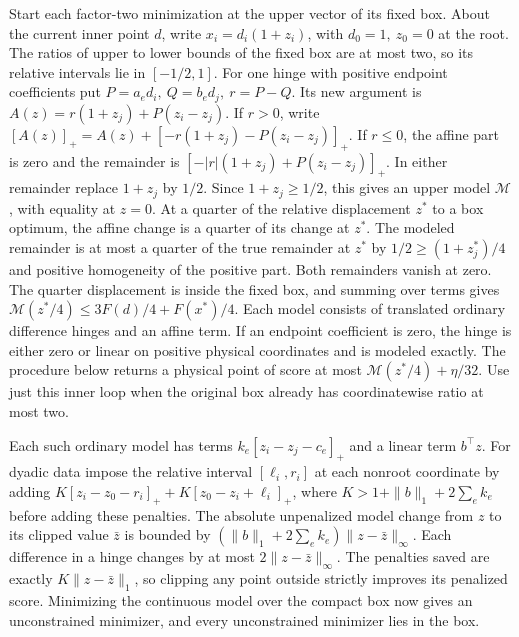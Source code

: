 \documentclass[11pt]{article}
\begin{document}
Start each factor-two minimization at the upper vector of its fixed box. About the current inner point \(d\), write \(x_i=d_i(1+z_i)\), with \(d_0=1,\ z_0=0\) at the root. The ratios of upper to lower bounds of the fixed box are at most two, so its relative intervals lie in \([-1/2,1]\). For one hinge with positive endpoint coefficients put \(P=a_e d_i,\ Q=b_e d_j,\ r=P-Q\). Its new argument is \(A(z)=r(1+z_j)+P(z_i-z_j)\). If \(r>0\), write \([A(z)]_+=A(z)+[-r(1+z_j)-P(z_i-z_j)]_+\). If \(r\le0\), the affine part is zero and the remainder is \([-|r|(1+z_j)+P(z_i-z_j)]_+\). In either remainder replace \(1+z_j\) by \(1/2\). Since \(1+z_j\ge1/2\), this gives an upper model \(\mathcal M\), with equality at \(z=0\). At a quarter of the relative displacement \(z^*\) to a box optimum, the affine change is a quarter of its change at \(z^*\). The modeled remainder is at most a quarter of the true remainder at \(z^*\) by \(1/2\ge(1+z_j^*)/4\) and positive homogeneity of the positive part. Both remainders vanish at zero. The quarter displacement is inside the fixed box, and summing over terms gives \(\mathcal M(z^*/4)\le3F(d)/4+F(x^*)/4\). Each model consists of translated ordinary difference hinges and an affine term. If an endpoint coefficient is zero, the hinge is either zero or linear on positive physical coordinates and is modeled exactly. The procedure below returns a physical point of score at most \(\mathcal M(z^*/4)+\eta/32\). Use just this inner loop when the original box already has coordinatewise ratio at most two.

Each such ordinary model has terms \(k_e[z_i-z_j-c_e]_+\) and a linear term \(b^\top z\). For dyadic data impose the relative interval \([\ell_i,r_i]\) at each nonroot coordinate by adding \(K[z_i-z_0-r_i]_++K[z_0-z_i+\ell_i]_+\), where \(K>1+\|b\|_1+2\sum_e k_e\) before adding these penalties. The absolute unpenalized model change from \(z\) to its clipped value \(\bar z\) is bounded by \((\|b\|_1+2\sum_e k_e)\|z-\bar z\|_\infty\). Each difference in a hinge changes by at most \(2\|z-\bar z\|_\infty\). The penalties saved are exactly \(K\|z-\bar z\|_1\), so clipping any point outside strictly improves its penalized score. Minimizing the continuous model over the compact box now gives an unconstrained minimizer, and every unconstrained minimizer lies in the box.
\end{document}
